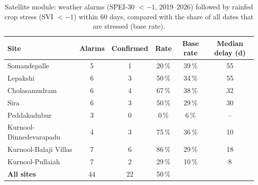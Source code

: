 \begin{table}[H]
\centering
\caption{Satellite module: weather alarms (SPEI-30 $< -1$, 2019--2026) followed by rainfed crop stress (SVI $< -1$) within 60 days, compared with the share of all dates that are stressed (base rate).}
\label{tab:s_confirm}
\footnotesize
\begin{tabular}{@{}lccccc@{}}
\toprule
\textbf{Site} & \textbf{Alarms} & \textbf{Confirmed} & \textbf{Rate} & \textbf{Base rate} & \textbf{Median delay (d)} \\
\midrule
Somandepalle & 5 & 1 & 20\,\% & 39\,\% & 55 \\
Lepakshi & 6 & 3 & 50\,\% & 34\,\% & 55 \\
Cholasamudram & 6 & 4 & 67\,\% & 38\,\% & 32 \\
Sira & 6 & 3 & 50\,\% & 29\,\% & 30 \\
Peddakadubur & 3 & 0 & 0\,\% & 6\,\% & -- \\
Kurnool-Dinnedevarapadu & 4 & 3 & 75\,\% & 36\,\% & 10 \\
Kurnool-Balaji Villas & 7 & 6 & 86\,\% & 29\,\% & 18 \\
Kurnool-Pullaiah & 7 & 2 & 29\,\% & 10\,\% & 8 \\
\textbf{All sites} & 44 & 22 & 50\,\% &  &  \\
\bottomrule
\end{tabular}
\end{table}
